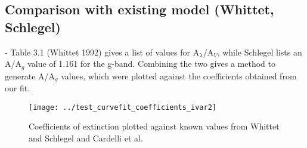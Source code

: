 \documentclass[manuscript]{aastex}
\begin{document}
\subsection{Comparison with existing model (Whittet, Schlegel)}
- Table 3.1 (Whittet 1992) gives a list of values for A$_\lambda$/A$_V$, while Schlegel lists an A/A$_g$ value of 1.161 for the g-band. Combining the two gives a method to generate A/A$_g$ values, which were plotted against the coefficients obtained from our fit.
\begin{figure}
\texttt{[image: ../test\_curvefit\_coefficients\_ivar2]}\\
\caption{Coefficients of extinction plotted against known values from Whittet and Schlegel and Cardelli et al.}
\end{figure}
\end{document}
